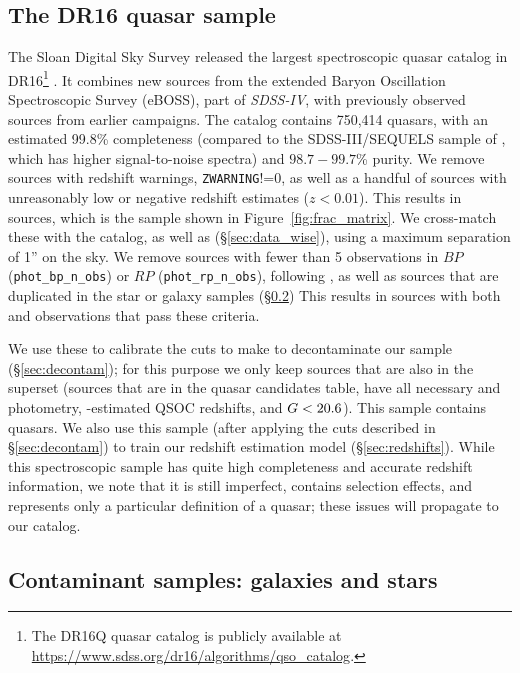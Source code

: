 \subsection{The \SDSS DR16 quasar sample}
\label{sec:data_sdss_quasars}

The Sloan Digital Sky Survey released the largest spectroscopic quasar catalog in DR16\footnote{The \SDSS DR16Q quasar catalog is publicly available at \url{https://www.sdss.org/dr16/algorithms/qso_catalog}.} \citep{lyke_sloan_2020}.
It combines new sources from the extended Baryon Oscillation Spectroscopic Survey (eBOSS), part of \textsl{SDSS-IV}, with previously observed sources from earlier \SDSS campaigns.
The catalog contains 750,414 quasars, with an estimated 99.8\% completeness (compared to the SDSS-III/SEQUELS sample of \citealt{myers_sdss-iv_2015}, which has higher signal-to-noise spectra) and $98.7-99.7$\% purity.
We remove sources with redshift warnings, \texttt{ZWARNING}!=0, as well as a handful of sources with unreasonably low or negative redshift estimates ($z<0.01$). 
This results in  sources, which is the sample shown in Figure~\ref{fig:frac_matrix}.
We cross-match these with the \Gaia catalog, as well as \unWISE (\S\ref{sec:data_wise}), using a maximum separation of 1'' on the sky.
We remove sources with fewer than 5 observations in $BP$ (\texttt{phot\_bp\_n\_obs}) or $RP$ (\texttt{phot\_rp\_n\_obs}), following \citep{bailer-jones_dsc_2021}, as well as sources that are duplicated in the \SDSS star or galaxy samples (\S\ref{sec:data_contaminants}) 
This results in  sources with both \Gaia and \unWISE observations that pass these criteria.

We use these to calibrate the cuts to make to decontaminate our sample (\S\ref{sec:decontam}); for this purpose we only keep sources that are also in the \cat superset (sources that are in the \Gaia quasar candidates table, have all necessary \Gaia and \unWISE photometry, \Gaia-estimated QSOC redshifts, and $G < 20.6$).
This sample contains  quasars.
We also use this sample (after applying the cuts described in \S\ref{sec:decontam}) to train our redshift estimation model (\S\ref{sec:redshifts}).
While this spectroscopic sample has quite high completeness and accurate redshift information, we note that it is still imperfect, contains selection effects, and represents only a particular definition of a quasar; these issues will propagate to our catalog.


\subsection{Contaminant samples: galaxies and stars}
\label{sec:data_contaminants}

